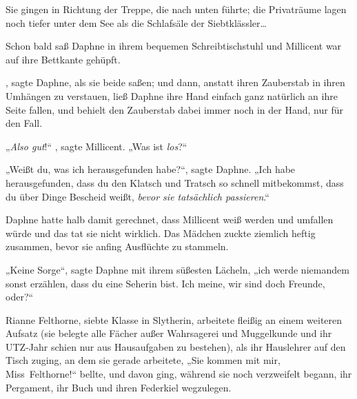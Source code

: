 Sie gingen in Richtung der Treppe, die nach unten führte; die Privaträume lagen noch tiefer unter dem See als die Schlafsäle der Siebtklässler…

Schon bald saß Daphne in ihrem bequemen Schreibtischstuhl und Millicent war auf ihre Bettkante gehüpft.

, sagte Daphne, als sie beide saßen; und dann, anstatt ihren Zauberstab in ihren Umhängen zu verstauen, ließ Daphne ihre Hand einfach ganz natürlich an ihre Seite fallen, und behielt den Zauberstab dabei immer noch in der Hand, nur für den Fall.

„\emph{Also gut}!“ , sagte Millicent. „Was ist \emph{los}?“

„Weißt du, was ich herausgefunden habe?“, sagte Daphne. „Ich habe herausgefunden, dass du den Klatsch und Tratsch so schnell mitbekommst, dass du über Dinge Bescheid weißt, \emph{bevor sie tatsächlich passieren}.“

Daphne hatte halb damit gerechnet, dass Millicent weiß werden und umfallen würde und das tat sie nicht wirklich. Das Mädchen zuckte ziemlich heftig zusammen, bevor sie anfing Ausflüchte zu stammeln.

„Keine Sorge“, sagte Daphne mit ihrem süßesten Lächeln, „ich werde niemandem sonst erzählen, dass du eine Seherin bist. Ich meine, wir sind doch Freunde, oder?“

\later

Rianne Felthorne, siebte Klasse in Slytherin, arbeitete fleißig an einem weiteren Aufsatz (sie belegte alle Fächer außer Wahrsagerei und Muggelkunde und ihr UTZ-Jahr schien nur aus Hausaufgaben zu bestehen), als ihr Hauslehrer auf den Tisch zuging, an dem sie gerade arbeitete, „Sie kommen mit mir, Miss~Felthorne!“ bellte, und davon ging, während sie noch verzweifelt begann, ihr Pergament, ihr Buch und ihren Federkiel wegzulegen.

